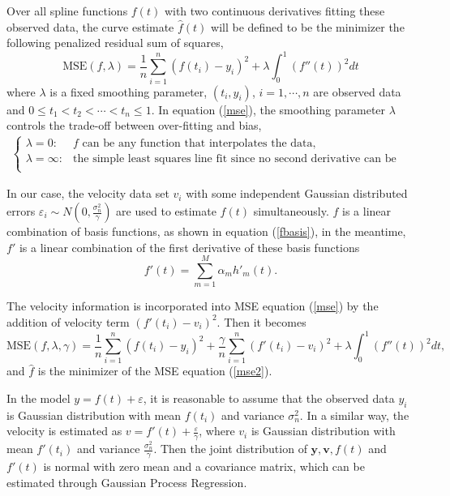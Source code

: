 Over all spline functions $f(t)$ with two continuous derivatives fitting these observed data, the curve estimate  $\hat{f}(t)$ will be defined to be the minimizer the following penalized residual sum of squares, 
\begin{equation}\label{mse}
\text{MSE}(f,\lambda)=\frac{1}{n}\sum_{i=1}^n(f(t_i)-y_i)^2+\lambda \int_{0}^{1}(f''(t))^2dt
\end{equation}
where $\lambda$ is a fixed smoothing parameter, $(t_i,y_i)$, $i=1, \cdots, n$ are observed data and $0 \leq t_1< t_2 < \cdots <t_n \leq 1$. In equation (\ref{mse}),  the smoothing parameter $\lambda$ controls the trade-off between over-fitting and bias,
\begin{align}
\begin{cases}
\lambda = 0 : & \mbox{$f$ can be any function that interpolates the data,}\\
\lambda = \infty: & \mbox{the simple least squares line fit since no second derivative can be tolerated.}\\
\end{cases}
\end{align}

In our case, the velocity data set $v_i$ with some independent Gaussian distributed errors $\varepsilon_i \sim N(0, \frac{\sigma_n^2}{\gamma})$ are used to estimate $f(t)$ simultaneously. $f$ is a linear combination of basis functions, as shown in equation (\ref{fbasis}), in the meantime, $f'$ is a linear combination of the first derivative of these basis functions
\begin{equation}
f'(t) =\sum_{m=1}^{M}\alpha_mh'_m(t).
\end{equation}

The velocity information  is incorporated into MSE  equation (\ref{mse}) by the addition of velocity term $(f'(t_i)-v_i)^2$. Then it becomes 
\begin{equation}\label{mse2}
\text{MSE}(f,\lambda,\gamma)=\frac{1}{n}\sum_{i=1}^n(f(t_i)-y_i)^2+\frac{\gamma}{n} \sum_{i=1}^n(f'(t_i)-v_i)^2+\lambda \int_{0}^{1}(f''(t))^2dt,
\end{equation}
and $\hat{f}$ is the minimizer of the MSE equation (\ref{mse2}).

In the model $y=f(t)+\varepsilon$, it is reasonable to assume that the observed data $y_i$ is Gaussian distribution with mean $f(t_i)$ and variance $\sigma_n^2$. In a similar way, the velocity is estimated as  $v=f'(t)+\frac{\varepsilon}{\gamma}$, where $v_i$ is Gaussian distribution with mean $f'(t_i)$ and variance $\frac{\sigma_n^2}{\gamma}$. Then the joint distribution of $\mathbf{y},\mathbf{v},f(t)$ and $f'(t)$ is normal with zero mean and a covariance matrix, which can be estimated through Gaussian Process Regression.

